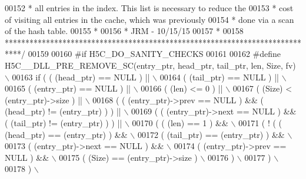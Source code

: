 \begin{DoxyCode}
00152 \textcolor{comment}{ *    all entries in the index.  This list is necessary to reduce the }
00153 \textcolor{comment}{ *    cost of visiting all entries in the cache, which was previously}
00154 \textcolor{comment}{ *    done via a scan of the hash table.}
00155 \textcolor{comment}{ *}
00156 \textcolor{comment}{ *                          JRM - 10/15/15}
00157 \textcolor{comment}{ *}
00158 \textcolor{comment}{ ****************************************************************************/}
00159 
00160 \textcolor{preprocessor}{#if H5C\_DO\_SANITY\_CHECKS}
00161 
00162 \textcolor{preprocessor}{#define H5C\_\_DLL\_PRE\_REMOVE\_SC(entry\_ptr, head\_ptr, tail\_ptr, len, Size, fv) \(\backslash\)}
00163 \textcolor{preprocessor}{if ( ( (head\_ptr) == NULL ) ||                                               \(\backslash\)}
00164 \textcolor{preprocessor}{     ( (tail\_ptr) == NULL ) ||                                               \(\backslash\)}
00165 \textcolor{preprocessor}{     ( (entry\_ptr) == NULL ) ||                                              \(\backslash\)}
00166 \textcolor{preprocessor}{     ( (len) <= 0 ) ||                                                       \(\backslash\)}
00167 \textcolor{preprocessor}{     ( (Size) < (entry\_ptr)->size ) ||                                       \(\backslash\)}
00168 \textcolor{preprocessor}{     ( ( (entry\_ptr)->prev == NULL ) && ( (head\_ptr) != (entry\_ptr) ) ) ||   \(\backslash\)}
00169 \textcolor{preprocessor}{     ( ( (entry\_ptr)->next == NULL ) && ( (tail\_ptr) != (entry\_ptr) ) ) ||   \(\backslash\)}
00170 \textcolor{preprocessor}{     ( ( (len) == 1 ) &&                                                     \(\backslash\)}
00171 \textcolor{preprocessor}{       ( ! ( ( (head\_ptr) == (entry\_ptr) ) &&                                \(\backslash\)}
00172 \textcolor{preprocessor}{             ( (tail\_ptr) == (entry\_ptr) ) &&                                \(\backslash\)}
00173 \textcolor{preprocessor}{             ( (entry\_ptr)->next == NULL ) &&                                \(\backslash\)}
00174 \textcolor{preprocessor}{             ( (entry\_ptr)->prev == NULL ) &&                                \(\backslash\)}
00175 \textcolor{preprocessor}{             ( (Size) == (entry\_ptr)->size )                                 \(\backslash\)}
00176 \textcolor{preprocessor}{           )                                                                 \(\backslash\)}
00177 \textcolor{preprocessor}{       )                                                                     \(\backslash\)}
00178 \textcolor{preprocessor}{     )                                                                       \(\backslash\)}

\end{DoxyCode}
